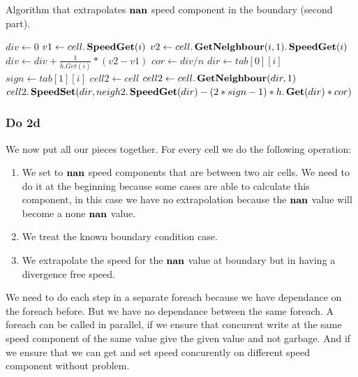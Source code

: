 \begin{algorithm}
\caption{Algorithm that extrapolates $\mathop{\textbf{nan}}$ speed component in the boundary (second part).}
\label{code:ApplyNanExtrap2}
\begin{algorithmic}[1]
	\State $div \gets 0$ 
	\State $v1 \gets cell.\mathop{\textbf{SpeedGet}}(i)$
	\State $v2 \gets cell.\mathop{\textbf{GetNeighbour}}(i,1).\mathop{\textbf{SpeedGet}}(i)$
	\State $div \gets div+\frac{1}{h.Get(i)}*(v2-v1)$
	\EndFor
	\State $cor \gets div/n$
	\State $dir \gets tab[0][i]$
	\State $sign \gets tab[1][i]$
	\State $cell2 \gets cell$
		\State $cell2 \gets cell.\mathop{\textbf{GetNeighbour}}(dir,1)$
	\EndIf
	\State $cell2.\mathop{\textbf{SpeedSet}}(dir,neigh2.\mathop{\textbf{SpeedGet}}(dir)-(2*sign-1)*h.\mathop{\textbf{Get}}(dir)*cor)$
	\EndFor
\EndFunction
\end{algorithmic}
\end{algorithm}

\subsubsection{Do 2d}

We now put all our pieces together.
For every cell we do the following operation:
\begin{enumerate}
\item We set to $\mathop{\textbf{nan}}$ speed components that are between two air cells.
We need to do it at the beginning because some cases are able to calculate this component,
in this case we have no extrapolation because the $\mathop{\textbf{nan}}$ value will become a none $\mathop{\textbf{nan}}$ value.
\item We treat the known boundary condition case.
\item We extrapolate the speed for the $\mathop{\textbf{nan}}$ value at boundary but in having a divergence free speed.
\end{enumerate}

We need to do each step in a separate foreach because we have dependance on the foreach before.
But we have no dependance between the same foreach.
A foreach can be called in parallel, if we ensure that concurent write at the same speed component of the same value
give the given value and not garbage.
And if we ensure that we can get and set speed concurently on different speed component without problem.

